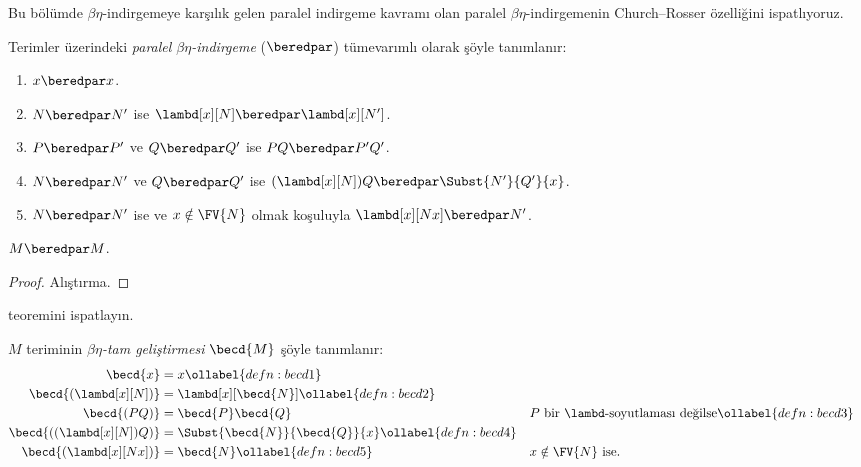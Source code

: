 \documentclass[../../../include/open-logic-section]{subfiles}
\begin{document}


Bu bölümde $\beta\eta$-indirgemeye karşılık gelen paralel indirgeme kavramı
olan paralel $\beta\eta$-indirgemenin Church--Rosser özelliğini ispatlıyoruz.

\begin{defn}
  Terimler üzerindeki \emph{paralel $\beta\eta$-indirgeme} ($\beredpar$)
  tümevarımlı olarak şöyle tanımlanır:
  \begin{enumerate}
    \item {} $x \beredpar x$.
    \item {} $N \beredpar N'$ ise
      $\lambd[x][N] \beredpar \lambd[x][N']$.
    \item {} $P \beredpar P'$ ve $Q \beredpar Q'$ ise
      $PQ \beredpar P'Q'$.
    \item {} $N \beredpar N'$ ve $Q \beredpar Q'$ ise
      $(\lambd[x][N])Q \beredpar \Subst{N'}{Q'}{x}$.
    \item {} $N \beredpar N'$ ise ve
      $x \notin \FV{N}$ olmak koşuluyla
      $\lambd[x][Nx] \beredpar N'$.
  \end{enumerate}
\end{defn}

\begin{thm}
  $M \beredpar M$.
\end{thm}

\begin{proof}
  Alıştırma.
\end{proof}

\begin{prob}
   teoremini ispatlayın.
\end{prob}

\begin{defn}
  $M$ teriminin \emph{$\beta\eta$-tam geliştirmesi} $\becd{M}$ şöyle
  tanımlanır:
  \begin{align}
    \becd{x} &= x \ollabel{defn:becd1} \\
    \becd{(\lambd[x][N])} &= \lambd[x][\becd{N}] \ollabel{defn:becd2}\\
    \becd{(PQ)} &= \becd{P}\becd{Q} && \text{$P$ bir $\lambd$-soyutlaması değilse}
    \ollabel{defn:becd3} \\
    \becd{((\lambd[x][N])Q)} &= \Subst{\becd{N}}{\becd{Q}}{x}
                             \ollabel{defn:becd4} \\
    \becd{(\lambd[x][Nx])} &= \becd{N} \ollabel{defn:becd5} &&
                             \text{$x\notin\FV{N}$ ise.}
  \end{align}
\end{defn}
\end{document}
